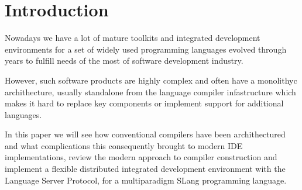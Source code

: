 \chapter{Introduction}
\label{chap:intro}

Nowadays we have a lot of mature toolkits and integrated development environments for a set of widely used programming languages
evolved through years to fulfill needs of the most of software development industry.

However, such software products are highly complex and often have a monolithyc archithecture, usually standalone 
from the language compiler infastructure which makes it hard to replace key components or implement support for additional languages.

In this paper we will see how conventional compilers have been archithectured and what complications 
this consequently brought to modern IDE implementations, review the modern approach to compiler construction and implement a flexible 
distributed integrated development environment with the \\Language Server Protocol, for a multiparadigm SLang programming language. 